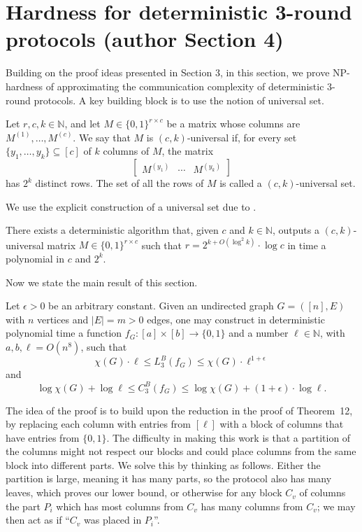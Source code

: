 \section*{Hardness for deterministic 3-round protocols (author Section 4)}
Building on the proof ideas presented in Section 3, in this section, we prove NP-hardness of approximating the communication complexity of deterministic 3-round protocols. A key building block is to use the notion of universal set.
\setcounter{theorem}{14}
\begin{definition}
Let $r,c,k\in\mathbb N$, and let $M\in\{0,1\}^{r\times c}$ be a matrix whose columns are $M^{(1)},\ldots,M^{(c)}$. We say that $M$ is $(c,k)$-universal if, for every set $\{y_1,\ldots,y_k\}\subseteq[c]$ of $k$ columns of $M$, the matrix
\[\begin{bmatrix}M^{(y_1)}&\cdots&M^{(y_k)}\end{bmatrix}\]
has $2^k$ distinct rows. The set of all the rows of $M$ is called a $(c,k)$-universal set.
\end{definition}
We use the explicit construction of a universal set due to \cite{ref49}.
\begin{lemma}
There exists a deterministic algorithm that, given $c$ and $k\in\mathbb N$, outputs a $(c,k)$-universal matrix $M\in\{0,1\}^{r\times c}$ such that $r=2^{k+O(\log^2 k)}\cdot\log c$ in time a polynomial in $c$ and $2^k$.
\end{lemma}
Now we state the main result of this section.
\begin{theorem}\label{thm:boolean-construction}
Let $\epsilon>0$ be an arbitrary constant. Given an undirected graph $G=([n],E)$ with $n$ vertices and $|E|=m>0$ edges, one may construct in deterministic polynomial time a function $f_G:[a]\times[b]\to\{0,1\}$ and a number $\ell\in\mathbb N$, with $a,b,\ell=O(n^8)$, such that
\[\chi(G)\cdot\ell\le L_3^B(f_G)\le\chi(G)\cdot\ell^{1+\epsilon}\]
and
\[\log\chi(G)+\log\ell\le C_3^B(f_G)\le\log\chi(G)+(1+\epsilon)\cdot\log\ell.\]
\end{theorem}
The idea of the proof is to build upon the reduction in the proof of Theorem~12, by replacing each column with entries from $[\ell]$ with a block of columns that have entries from $\{0,1\}$. The difficulty in making this work is that a partition of the columns might not respect our blocks and could place columns from the same block into different parts. We solve this by thinking as follows. Either the partition is large, meaning it has many parts, so the protocol also has many leaves, which proves our lower bound, or otherwise for any block $C_v$ of columns the part $P_i$ which has most columns from $C_v$ has many columns from $C_v$; we may then act as if ``$C_v$ was placed in $P_i$''.
